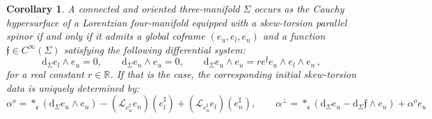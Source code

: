 \documentclass[10pt,reqno,a4paper]{amsart}
\theoremstyle{plain}
\newtheorem{cor}[thm]{Corollary}
\theoremstyle{definition}
\theoremstyle{remark}
\theoremstyle{remark}
\def\dd{\mathrm{d}}
\def\cL{\mathcal{L}}
\def\cL{\mathcal{L}}
\def\fre{\mathfrak{e}}
\renewcommand{\(}{ (}
\renewcommand{\)}{ )}
\newcommand{\frf}{\mathfrak{f}}
\begin{document}
\begin{cor}
\label{cor:initialdataskew}
A connected and oriented three-manifold $\Sigma$ occurs as the Cauchy hypersurface of a Lorentzian four-manifold equipped with a skew-torsion parallel spinor if and only if it admits a global coframe $(e_u,e_l,e_n)$ and a function $\frf\in C^{\infty}(\Sigma)$ satisfying the following differential system:
\begin{equation}
\label{eq:constraintsfinal}
\dd_\Sigma e_l\wedge e_u=0,  \qquad \dd_\Sigma e_n\wedge e_u=0, \qquad \dd_{\Sigma}e_u \wedge e_u  = r e^{\frf} e_u\wedge e_l\wedge e_n \, ,
\end{equation}
for a real constant $r\in \mathbb{R}$. If that is the case, the corresponding initial skew-torsion data is uniquely determined by:
\begin{equation}
\label{eq:alphafinal}
\alpha^o= \ast_{\fre} (\dd_{\Sigma} e_u \wedge e_u)- (\cL_{e^{\sharp}_u}e_n)(e^{\sharp}_l) + (\cL_{e^{\sharp}_u}e_l)(e^{\sharp}_n) , \qquad \alpha^\perp =\ast_\fre (\dd_\Sigma e_u-\dd_\Sigma\frf\wedge e_u ) + \alpha^o e_u
\end{equation} 
\end{cor} 
\end{document}
